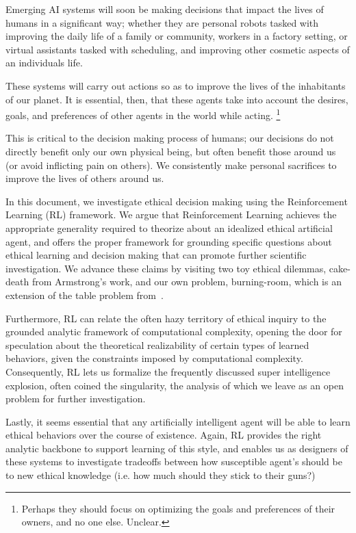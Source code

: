\documentclass[11pt]{article}
\begin{document}
Emerging AI systems will soon be making decisions that impact the lives of humans in a significant way; whether they are personal robots tasked with improving the daily life of a family or community,  workers in a factory setting, or virtual assistants tasked with scheduling, and improving other cosmetic aspects of an individuals life.

These systems will carry out actions so as to improve the lives of the inhabitants of our planet. It is essential, then, that these agents take into account the desires, goals, and preferences of other agents in the world while acting. \footnote{Perhaps they should focus on optimizing the goals and preferences of their owners, and no one else. Unclear.}

This is critical to the decision making process of humans; our decisions do not directly benefit only our own physical being, but often benefit those around us (or avoid inflicting pain on others). We consistently make personal sacrifices to improve the lives of others around us.

In this document, we investigate ethical decision making using the Reinforcement Learning (RL) framework.
We argue that Reinforcement Learning achieves the appropriate generality required to theorize about an idealized ethical artificial agent, and offers the proper framework for grounding specific questions about ethical learning and decision making that can promote further scientific investigation. We advance these claims by visiting two toy ethical dilemmas, cake-death from Armstrong's work, and our own problem, burning-room, which is an extension of the table problem from~\cite{briggs2015sorry}.

Furthermore, RL can relate the often hazy territory of ethical inquiry to the grounded analytic framework of computational complexity, opening the door for speculation about the theoretical realizability of certain types of learned behaviors, given the constraints imposed by computational complexity. Consequently, RL lets us formalize the frequently discussed super intelligence explosion, often coined the singularity, the analysis of which we leave as an open problem for further investigation.

Lastly, it seems essential that any artificially intelligent agent will be able to learn ethical behaviors over the course of existence. Again, RL provides the right analytic backbone to support learning of this style, and enables us as designers of these systems to investigate tradeoffs between how susceptible agent's should be to new ethical knowledge (i.e. how much should they stick to their guns?)
\end{document}
